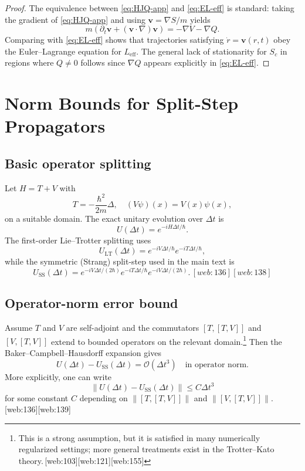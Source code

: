 \documentclass[11pt]{article}
\begin{document}
\begin{itemize}[leftmargin=*]
\begin{proof}
The equivalence between \eqref{eq:HJQ-app} and \eqref{eq:EL-eff} is standard: taking the gradient of \eqref{eq:HJQ-app} and using \(\mathbf{v}=\nabla S/m\) yields
\[
m\left(\partial_t \mathbf{v}+(\mathbf{v}\cdot\nabla)\mathbf{v}\right) = -\nabla V - \nabla Q.
\]
Comparing with \eqref{eq:EL-eff} shows that trajectories satisfying \(\dot r=\mathbf{v}(r,t)\) obey the Euler--Lagrange equation for \(L_{\text{eff}}\).
The general lack of stationarity for \(S_c\) in regions where \(Q\neq 0\) follows since \(\nabla Q\) appears explicitly in \eqref{eq:EL-eff}.
\end{proof}

\section{Norm Bounds for Split-Step Propagators}

\subsection{Basic operator splitting}

Let \(H = T + V\) with
\[
T = -\frac{\hbar^2}{2m}\Delta,\quad (V\psi)(x) = V(x)\psi(x),
\]
on a suitable domain.
The exact unitary evolution over \(\Delta t\) is
\[
U(\Delta t) = e^{-iH\Delta t/\hbar}.
\]
The first-order Lie--Trotter splitting uses
\[
U_{\text{LT}}(\Delta t) = e^{-iV\Delta t/\hbar} e^{-iT\Delta t/\hbar},
\]
while the symmetric (Strang) split-step used in the main text is
\[
U_{\text{SS}}(\Delta t) = e^{-iV\Delta t/(2\hbar)} e^{-iT\Delta t/\hbar} e^{-iV\Delta t/(2\hbar)}.\,[web:136][web:138]
\]

\subsection{Operator-norm error bound}

Assume \(T\) and \(V\) are self-adjoint and the commutators \([T,[T,V]]\) and \([V,[T,V]]\) extend to bounded operators on the relevant domain.\footnote{This is a strong assumption, but it is satisfied in many numerically regularized settings; more general treatments exist in the Trotter--Kato theory.\,[web:103][web:121][web:155]}
Then the Baker--Campbell--Hausdorff expansion gives
\[
U(\Delta t) - U_{\text{SS}}(\Delta t)
= \mathcal{O}(\Delta t^3)\quad\text{in operator norm}.
\]
More explicitly, one can write
\begin{equation}
\|U(\Delta t)-U_{\text{SS}}(\Delta t)\|
\le C \Delta t^3\label{eq:SS-bound}
\end{equation}
for some constant \(C\) depending on \(\|[T,[T,V]]\|\) and \(\|[V,[T,V]]\|\).\,[web:136][web:139]


\end{itemize}
\end{document}
